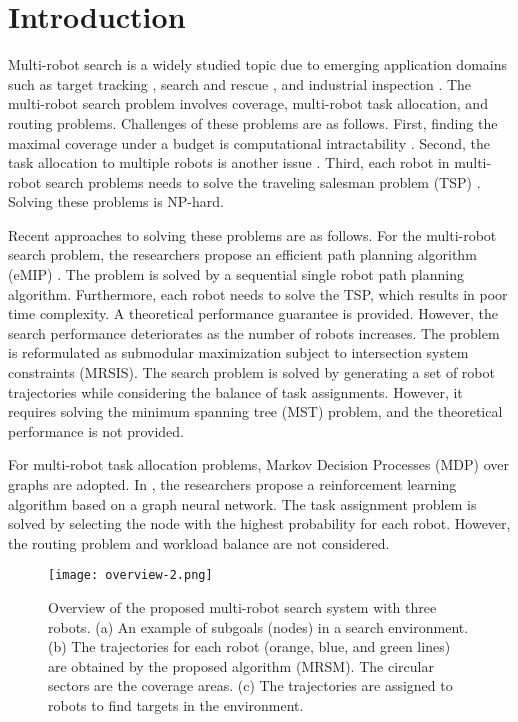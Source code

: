 \chapter{Introduction}

Multi-robot search is a widely studied topic due to emerging application domains such as target tracking \cite{schlotfeldt2018anytime}, search and rescue \cite{jennings1997cooperative}, and industrial inspection \cite{correll2009multirobot}.
The multi-robot search problem involves coverage, multi-robot task allocation, and routing problems.
Challenges of these problems are as follows.
First, finding the maximal coverage under a budget is computational intractability \cite{khuller1999budgeted}.
Second, the task allocation to multiple robots is another issue \cite{korsah2013comprehensive}.
Third, each robot in multi-robot search problems needs to solve the traveling salesman problem (TSP) \cite{zhang2016submodular}.
Solving these problems is NP-hard.

Recent approaches to solving these problems are as follows.
For the multi-robot search problem,
the researchers propose an efficient path planning algorithm (eMIP) \cite{singh2007efficient}.
The problem is solved by a sequential single robot path planning algorithm.
Furthermore, each robot needs to solve the TSP, which results in poor time complexity.
A theoretical performance guarantee is provided.
However, the search performance deteriorates as the number of robots increases.
The problem is reformulated as submodular maximization subject to intersection system constraints (MRSIS)\cite{li2024mrsis}.
The search problem is solved by generating a set of robot trajectories while considering the balance of task assignments.
However, it requires solving the minimum spanning tree (MST) problem, and the theoretical performance is not provided.

For multi-robot task allocation problems, Markov Decision Processes (MDP) over graphs are adopted.
In \cite{paull2022learning}, the researchers propose a reinforcement learning algorithm based on a graph neural network.
The task assignment problem is solved by selecting the node with the highest probability for each robot.
However, the routing problem and workload balance are not considered.

\begin{figure}[htbp]
\centerline{\texttt{[image: overview-2.png]}}
\caption{Overview of the proposed multi-robot search system with three robots.
(a) An example of subgoals (nodes) in a search environment.
(b) The trajectories for each robot (orange, blue, and green lines) are obtained by the proposed algorithm (MRSM). The circular sectors are the coverage areas.
(c) The trajectories are assigned to robots to find targets in the environment.
}
\label{overview}
\end{figure}


